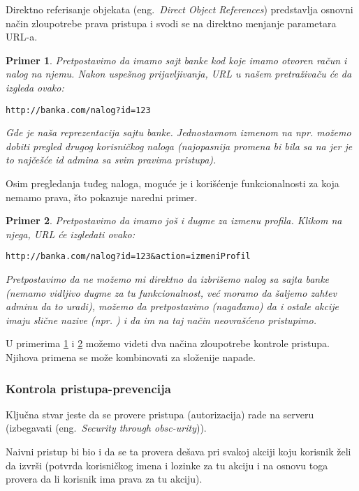\documentclass[a4paper]{article}
\newtheorem{primer}{Primer}[section]
\begin{document}
Direktno referisanje objekata (eng.~{\em Direct Object References}) predstavlja osnovni način zloupotrebe prava pristupa i svodi se na direktno menjanje parametara URL-a.
\begin{primer}
\label{primer3}
Pretpostavimo da imamo sajt banke kod koje imamo otvoren račun i nalog na njemu. Nakon uspešnog prijavljivanja, URL u našem pretraživaču će da izgleda ovako:
\begin{lstlisting}
http://banka.com/nalog?id=123
\end{lstlisting}
Gde je  naša reprezentacija sajtu banke. Jednostavnom izmenom  na npr.  možemo dobiti pregled drugog korisničkog naloga (najopasnija promena bi bila sa  na  jer je to najčešće id admina sa svim pravima pristupa).
\end{primer}
Osim pregledanja tuđeg naloga, moguće je i korišćenje funkcionalnosti za koja nemamo prava, što pokazuje naredni primer.
\begin{primer}
\label{primer4}
Pretpostavimo da imamo još i dugme za izmenu profila. Klikom na njega, URL će izgledati ovako:\\

\begin{lstlisting}
http://banka.com/nalog?id=123&action=izmeniProfil
\end{lstlisting}

Pretpostavimo da ne možemo mi direktno da izbrišemo nalog sa sajta banke (nemamo vidljivo dugme za tu funkcionalnost, već moramo da šaljemo zahtev adminu da to uradi), možemo da pretpostavimo (nagađamo) da i ostale akcije imaju slične nazive (npr. ) i da im na taj način neovrašćeno pristupimo.\\
\end{primer}
U primerima \ref{primer3} i \ref{primer4} možemo videti dva načina zloupotrebe kontrole pristupa. Njihova primena se može kombinovati za složenije napade.

\subsubsection{Kontrola pristupa-prevencija}

Ključna stvar jeste da se provere pristupa (autorizacija) rade na serveru (izbegavati (eng.~{\em Security through obsc-urity}\cite{AS})). 

Naivni pristup bi bio i da se ta provera dešava pri svakoj akciji koju korisnik želi da izvrši (potvrda korisničkog imena i lozinke za tu akciju i na osnovu toga provera da li korisnik ima prava za tu akciju).
\end{document}
